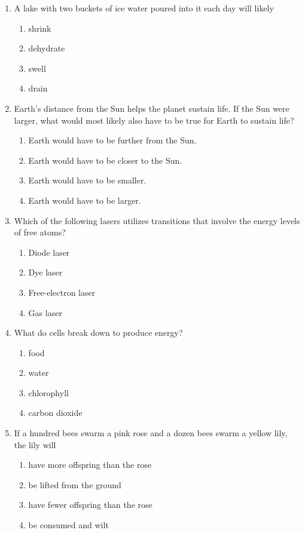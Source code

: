 \documentclass[12pt]{article}
\begin{document}
\begin{enumerate}[label=\arabic*.]
\begin{enumerate}[label=(\alph*)]
    \item 5,000
    \item 20,000
    \item 80,000
    \item 320,000
\end{enumerate}
\item A lake with two buckets of ice water poured into it each day will likely
\begin{enumerate}[label=(\alph*)]
    \item shrink
    \item dehydrate
    \item swell
    \item drain
\end{enumerate}
\item Earth's distance from the Sun helps the planet sustain life. If the Sun were larger, what would most likely also have to be true for Earth to sustain life?
\begin{enumerate}[label=(\alph*)]
    \item Earth would have to be further from the Sun.
    \item Earth would have to be closer to the Sun.
    \item Earth would have to be smaller.
    \item Earth would have to be larger.
\end{enumerate}
\item Which of the following lasers utilizes transitions that involve the energy levels of free atoms?
\begin{enumerate}[label=(\alph*)]
    \item Diode laser
    \item Dye laser
    \item Free-electron laser
    \item Gas laser
\end{enumerate}
\item What do cells break down to produce energy?
\begin{enumerate}[label=(\alph*)]
    \item food
    \item water
    \item chlorophyll
    \item carbon dioxide
\end{enumerate}
\item If a hundred bees swarm a pink rose and a dozen bees swarm a yellow lily, the lily will
\begin{enumerate}[label=(\alph*)]
    \item have more offspring than the rose
    \item be lifted from the ground
    \item have fewer offspring than the rose
    \item be consumed and wilt
\end{enumerate}
\end{enumerate}
\end{document}
